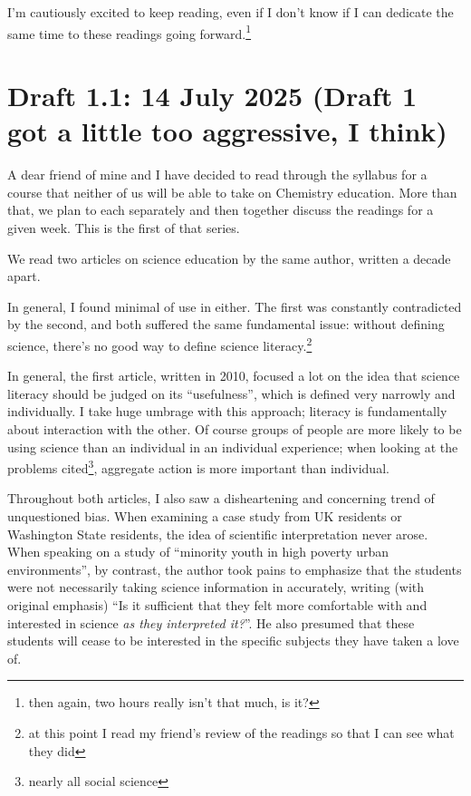 \documentclass[12pt]{article}
\newcommand{\say}[1]{``#1''}
\renewcommand{\,}{\textsuperscript{,}}
\begin{document}
I'm cautiously excited to keep reading, even if I don't know if I can dedicate the same time to these readings going forward.\footnote{then again, two hours really isn't that much, is it?}

\section{Draft 1.1: 14 July 2025 (Draft 1 got a little too aggressive, I think)}

A dear friend of mine and I have decided to read through the syllabus for a course that neither of us will be able to take on Chemistry education.  
More than that, we plan to each separately and then together discuss the readings for a given week.  
This is the first of that series.

We read two articles on science education by the same author, written a decade apart.

In general, I found minimal of use in either.  
The first was constantly contradicted by the second, and both suffered the same fundamental issue: without defining science, there's no good way to define science literacy.\footnote{at this point I read my friend's review of the readings so that I can see what they did}

In general, the first article, written in 2010, focused a lot on the idea that science literacy should be judged on its \say{usefulness}, which is defined very narrowly and individually.  
I take huge umbrage with this approach; literacy is fundamentally about interaction with the other.  
Of course groups of people are more likely to be using science than an individual in an individual experience; when looking at the problems cited\footnote{nearly all social science}, aggregate action is more important than individual.

Throughout both articles, I also saw a disheartening and concerning trend of unquestioned bias.  
When examining a case study from UK residents or Washington State residents, the idea of scientific interpretation never arose.  
When speaking on a study of \say{minority youth in high poverty urban environments}, by contrast, the author took pains to emphasize that the students were not necessarily taking science information in accurately, writing (with original emphasis) \say{Is it sufficient that they felt more comfortable with and interested in science \textit{as they interpreted it?}}.  
He also presumed that these students will cease to be interested in the specific subjects they have taken a love of.
\end{document}
